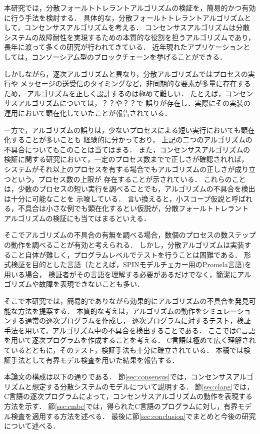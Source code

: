 \documentclass[technicalreport]{ieicej}
\theoremstyle{plain}
\begin{document}
本研究では，分散フォールトトレラントアルゴリズムの検証を，簡易的かつ有効に行う手法を検討する．
具体的な，分散フォールトトレラントアルゴリズムとして，コンセンサスアルゴリズムを考える．
コンセンサスアルゴリズムは分散システムの故障耐性を実現するための本質的な役割を担うアルゴリズムであり，
長年に渡って多くの研究が行われてきている．
近年現れたアプリケーションとしては，コンソーシアム型のブロックチェーンを挙げることができる．

しかしながら，逐次アルゴリズムと異なり，分散アルゴリズムではプロセスの実行や
メッセージの送受信のタイミングなど，非同期的な要素が多量に存在するため，
アルゴリズムを正しく設計するのは極めて難しい．
たとえば，コンセンサスアルゴリズムについては，？？や？？で
誤りが存在し．実際にその実装の運用において顕在化していたことが報告されている．

一方で，アルゴリズムの誤りは，少ないプロセスによる短い実行においても顕在化することが多いことも
経験的に分かっており，
上記の二つのアルゴリズムの不具合についてもこのことは当てはまる．
また，コンセンサスアルゴリズムの検証に関する研究において，一定のプロセス数までで正しさが確認されれば，
システムがそれ以上のプロセスを有する場合でもアルゴリズムの正しさが成り立つという，プロセス数の上限が
存在することが示されている．
これらのことは，少数のプロセスの短い実行を調べることでも，アルゴリズムの不具合を検出は十分に可能なことを
示唆している．
言い換えると，小スコープ仮説と呼ばれる，不具合は小さな例でも顕在化するとい仮説が，分散フォールトトレラント
アルゴリズムの検証にも当てはまるといえる．

そこでアルゴリズムの不具合の有無を調べる場合，数個のプロセスの数ステップの動作を調べることが有効と考えられる．
しかし，分散アルゴリズムは実装すること自体が難しく，プログラムレベルでテストを行うことは困難である．
形式検証を目的とした言語（たとえば，SPINモデルチェカー用のPromela言語\cite{spinbook})を用いる場合，
検証者がその言語を理解する必要があるだけでなく，簡潔にアルゴリズムや故障を表現できないことも多い．

そこで本研究では，簡易的でありながら効果的にアルゴリズムの不具合を発見可能な方法を提案する．
本質的な考えは，アルゴリズムの動作をシミュレーションする通常の逐次プログラムを作成し，
逐次プログラムに対するテスト，検証手法を用いて，アルゴリズム中の不具合を検出することである．
ここではC言語を用いて逐次プログラムを作成することを考える．
C言語は極めて広く理解されているとともに，そのテスト，検証手法も十分に確立されている．
本稿では検証手法として有界モデル検査を用いた結果を報告する．

本論文の構成は以下の通りである．
節\ref{sec:consensus}では，コンセンサスアルゴリズムと想定する分散システムのモデルについて説明する．
節\ref{sec:clang}では，C言語の逐次プログラムによって，コンセンサスアルゴリズムの動作を表現する方法を示す．
節\ref{sec:cmbc}では，得られたC言語のプログラムに対し，有界モデル検査を適用する方法を述べる．
最後に節\ref{sec:conclusion}でまとめと今後の研究について述べる．
\end{document}
